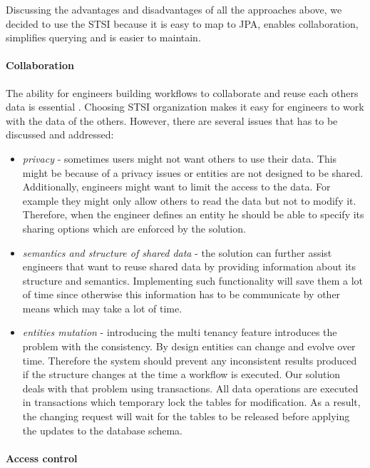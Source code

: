 \documentclass[a4paper, notitlepage]{article}
\begin{document}
Discussing the advantages and disadvantages of all the approaches above, we decided to use the STSI because it is easy to map to JPA, enables collaboration, simplifies querying and is easier to maintain.    

\paragraph{Collaboration}
The ability for engineers building workflows to collaborate and reuse each others data is essential \cite{Lu}. Choosing STSI organization makes it easy for engineers to work with the data of the others. However, there are several issues that has to be discussed and addressed:

\begin{itemize}

	\item \textit{privacy} - sometimes users might not want others to use their data. This might be because of a privacy issues or entities are not designed to be shared. Additionally, engineers might want to limit the access to the data. For example they might only allow others to read the data but not to modify it. Therefore, when the engineer defines an entity he should be able to specify its sharing options which are enforced by the solution.
	 
	\item \textit{semantics and structure of shared data} - the solution can further assist engineers that want to reuse shared data by providing information about its structure and semantics. Implementing such functionality will save them a lot of time since otherwise this information has to be communicate by other means which may take a lot of time.
	
	\item \textit{entities mutation} - introducing the multi tenancy feature introduces the problem with the consistency. By design entities can change and evolve over time. Therefore the system should prevent any inconsistent results produced if the structure changes at the time a workflow is executed. Our solution deals with that problem using transactions. All data operations are executed in transactions which temporary lock the tables for modification. As a result, the changing request will wait for the tables to be released before applying the updates to the database schema.
\end{itemize}


\paragraph{Access control}
\end{document}
